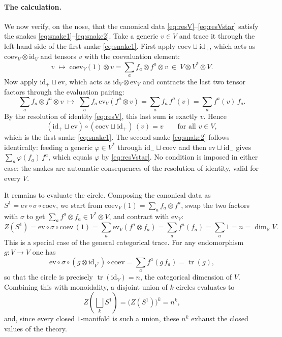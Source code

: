 \documentclass[prl,aps,10pt,superscriptaddress, floatfix]{revtex4-2}
\begin{document}
\paragraph{The calculation.}
We now verify, on the nose, that the canonical data \eqref{eq:resV}--\eqref{eq:resVstar} satisfy the snakes \eqref{eq:snake1}--\eqref{eq:snake2}. Take a generic $v\in V$ and trace it through the left-hand side of the first snake \eqref{eq:snake1}. First apply $\mathrm{coev}\sqcup\mathrm{id}_+$, which acts as $\mathrm{coev}_V\otimes\mathrm{id}_V$ and tensors $v$ with the coevaluation element:
\[
v\;\longmapsto\;\mathrm{coev}_V(1)\otimes v=\sum_a f_a\otimes f^a\otimes v\ \in\ V\otimes V^*\otimes V.
\]
Now apply $\mathrm{id}_+\sqcup\mathrm{ev}$, which acts as $\mathrm{id}_V\otimes\mathrm{ev}_V$ and contracts the last two tensor factors through the evaluation pairing:
\[
\sum_a f_a\otimes f^a\otimes v\;\longmapsto\;\sum_a f_a\,\mathrm{ev}_V(f^a\otimes v)=\sum_a f_a\,f^a(v)=\sum_a f^a(v)\,f_a.
\]
By the resolution of identity \eqref{eq:resV}, this last sum is exactly $v$. Hence
\[
(\mathrm{id}_+\sqcup\mathrm{ev})\circ(\mathrm{coev}\sqcup\mathrm{id}_+)\,(v)=v\qquad\text{for all }v\in V,
\]
which is the first snake \eqref{eq:snake1}. The second snake \eqref{eq:snake2} follows identically: feeding a generic $\varphi\in V^*$ through $\mathrm{id}_-\sqcup\mathrm{coev}$ and then $\mathrm{ev}\sqcup\mathrm{id}_-$ gives $\sum_a\varphi(f_a)\,f^a$, which equals $\varphi$ by \eqref{eq:resVstar}. No condition is imposed in either case: the snakes are automatic consequences of the resolution of identity, valid for every $V$.

It remains to evaluate the circle. Composing the canonical data as $S^1=\mathrm{ev}\circ\sigma\circ\mathrm{coev}$, we start from $\mathrm{coev}_V(1)=\sum_a f_a\otimes f^a$, swap the two factors with $\sigma$ to get $\sum_a f^a\otimes f_a\in V^*\otimes V$, and contract with $\mathrm{ev}_V$:
\[
Z(S^1)=\mathrm{ev}\circ\sigma\circ\mathrm{coev}\,(1)
=\sum_a \mathrm{ev}_V(f^a\otimes f_a)
=\sum_a f^a(f_a)
=\sum_a 1
=n=\dim_{\mathbb R}V.
\]
This is a special case of the general categorical trace. For any endomorphism $g:V\to V$ one has
\[
\mathrm{ev}\circ\sigma\circ(g\otimes\mathrm{id}_{V^*})\circ\mathrm{coev}
=\sum_a f^a(g\,f_a)
=\operatorname{tr}(g),
\]
so that the circle is precisely $\operatorname{tr}(\mathrm{id}_V)=n$, the categorical dimension of $V$. Combining this with monoidality, a disjoint union of $k$ circles evaluates to
\[
Z(\textstyle\bigsqcup_k S^1)=\big(Z(S^1)\big)^{k}=n^{k},
\]
and, since every closed $1$-manifold is such a union, these $n^k$ exhaust the closed values of the theory.
\end{document}
